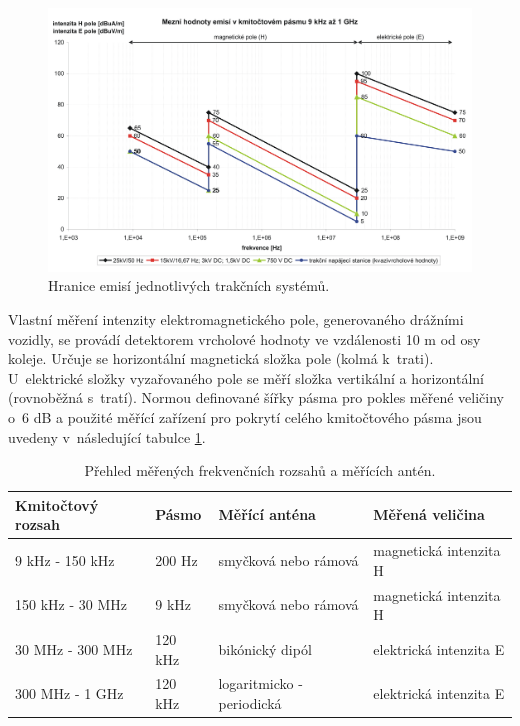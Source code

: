 \begin{figure}[!h]
	\centering
	\includegraphics[width=12cm]{emc_emise2.png}
	\caption{Hranice emisí jednotlivých trakčních systémů.}
	\label{obr:emc_emise}
\end{figure}

Vlastní měření intenzity elektromagnetického pole, generovaného drážními vozidly, se provádí detektorem vrcholové hodnoty ve vzdálenosti 10 m od osy koleje. Určuje se horizontální magnetická složka pole (kolmá k~trati). U~elektrické složky vyzařovaného pole se měří složka vertikální a horizontální (rovnoběžná s~tratí). Normou definované šířky pásma pro pokles měřené veličiny o~6 dB  a použité měřící zařízení pro pokrytí celého kmitočtového pásma jsou uvedeny v~následující tabulce \ref{tab:emc_fr_rozsah}.

\begin{table}[!h]
\begin{center}
  	\caption{Přehled měřených frekvenčních rozsahů a měřících antén.}
  	\label{tab:emc_fr_rozsah}
\begin{tabular}{|l|l|l|l|}
	\hline
	{\bf Kmitočtový rozsah} & {\bf Pásmo} & {\bf Měřící anténa} & {\bf Měřená veličina} \\
	\hline
	\hline
	9 kHz - 150 kHz	& 200 Hz	& smyčková nebo rámová	& magnetická intenzita  H \\
	150 kHz - 30 MHz	& 9 kHz	& smyčková nebo rámová	& magnetická intenzita H \\
	30 MHz - 300 MHz	& 120 kHz	& bikónický dipól		& elektrická intenzita E \\
	300 MHz - 1 GHz	& 120 kHz	& logaritmicko - periodická	& elektrická intenzita E \\
  	\hline
\end{tabular}
\end{center}
\end{table}

